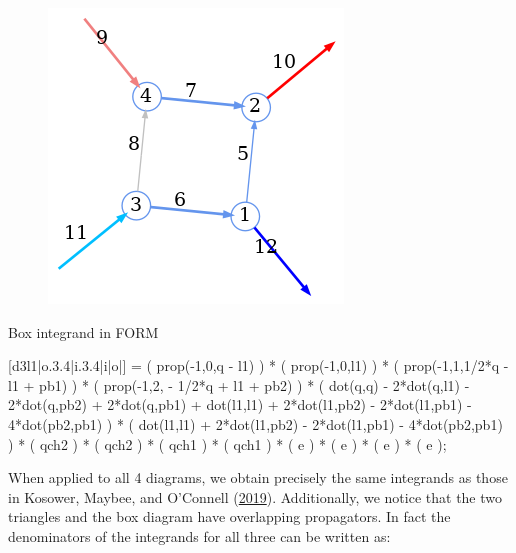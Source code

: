 \documentclass[
  11pt,
  a4paper,
  DIV=11,
  numbers=noendperiod,
  oneside]{scrreprt}
\newenvironment{Shaded}{\begin{snugshade}}{\end{snugshade}}
\newcommand{\NormalTok}[1]{\textcolor[rgb]{0.00,0.23,0.31}{#1}}
\DeclareRobustCommand{\[}{\begin{equation}}
\DeclareRobustCommand{\]}{\end{equation}}
\begin{document}
\begin{figure}


{\centering \includegraphics{./kruskalbox.png}

}

\end{figure}

\begin{codelisting}

\caption{Box integrand in FORM}

\hypertarget{lst-formBox}{%
\label{lst-formBox}}%
\begin{Shaded}
\begin{Highlighting}[]

\NormalTok{   [d3l1|o.3.4|i.3.4|i|o|] =}
\NormalTok{         ( prop({-}1,0,q {-} l1) )}
\NormalTok{       * ( prop({-}1,0,l1) )}
\NormalTok{       * ( prop({-}1,1,1/2*q {-} l1 + pb1) )}
\NormalTok{       * ( prop({-}1,2, {-} 1/2*q + l1 + pb2) )}
\NormalTok{       * ( dot(q,q) {-} 2*dot(q,l1) {-} 2*dot(q,pb2) + 2*dot(q,pb1) + dot(l1,l1)}
\NormalTok{          + 2*dot(l1,pb2) {-} 2*dot(l1,pb1) {-} 4*dot(pb2,pb1) )}
\NormalTok{       * ( dot(l1,l1) + 2*dot(l1,pb2) {-} 2*dot(l1,pb1) {-} 4*dot(pb2,pb1) )}
\NormalTok{       * ( qch2 ) * ( qch2 ) * ( qch1 ) * ( qch1 )}
\NormalTok{       * ( e ) * ( e ) * ( e ) * ( e );}
\end{Highlighting}
\end{Shaded}

\end{codelisting}

When applied to all 4 diagrams, we obtain precisely the same integrands
as those in Kosower, Maybee, and O'Connell
(\protect\hyperlink{ref-Kosower:2018adc}{2019}). Additionally, we notice
that the two triangles and the box diagram have overlapping propagators.
In fact the denominators of the integrands for all three can be written
as:
\end{document}
